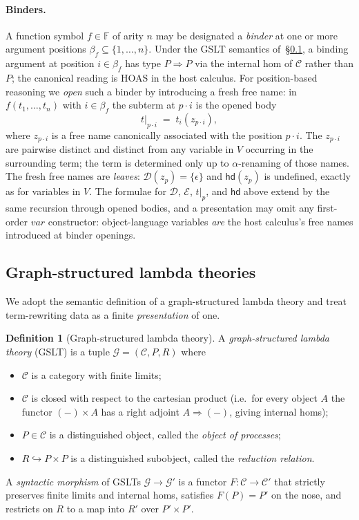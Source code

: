 \documentclass[11pt]{article}
\theoremstyle{plain}
\theoremstyle{definition}
\newtheorem{definition}[theorem]{Definition}
\theoremstyle{remark}
\newcommand{\hd}{\mathsf{hd}}
\newcommand{\dom}{\mathcal{D}}
\newcommand{\edges}{\mathcal{E}}
\begin{document}
\paragraph{Binders.}
A function symbol $f \in \mathbb{F}$ of arity $n$ may be designated a
\emph{binder} at one or more argument positions
$\beta_{f} \subseteq \{1, \ldots, n\}$. Under the GSLT semantics
of~\S\ref{ssec:gslt}, a binding argument at position $i \in \beta_{f}$
has type $P \Rightarrow P$ via the internal hom of $\mathcal{C}$
rather than $P$; the canonical reading is HOAS in the host calculus.
For position-based reasoning we \emph{open} such a binder by
introducing a fresh free name: in $f(t_{1}, \ldots, t_{n})$ with
$i \in \beta_{f}$ the subterm at $p \cdot i$ is the opened body
\[
  t|_{p \cdot i} \;=\; t_{i}(z_{p \cdot i}),
\]
where $z_{p \cdot i}$ is a free name canonically associated with the
position $p \cdot i$. The $z_{p \cdot i}$ are pairwise distinct and
distinct from any variable in $V$ occurring in the surrounding term;
the term is determined only up to $\alpha$-renaming of those names.
The fresh free names are \emph{leaves}: $\dom(z_{p}) = \{\epsilon\}$
and $\hd(z_{p})$ is undefined, exactly as for variables in $V$.
The formulae for $\dom$, $\edges$, $t|_{p}$, and $\hd$ above extend
by the same recursion through opened bodies, and a presentation may
omit any first-order $\mathit{var}$ constructor: object-language
variables \emph{are} the host calculus's free names introduced at
binder openings.

\subsection{Graph-structured lambda theories}\label{ssec:gslt}

We adopt the semantic definition of a graph-structured lambda theory
and treat term-rewriting data as a finite \emph{presentation} of one.

\begin{definition}[Graph-structured lambda theory]\label{def:gslt}
A \emph{graph-structured lambda theory} (GSLT) is a tuple
$\mathcal{G} = (\mathcal{C}, P, R)$ where
\begin{itemize}[leftmargin=*]
  \item $\mathcal{C}$ is a category with finite limits;
  \item $\mathcal{C}$ is closed with respect to the cartesian product
        (i.e.\ for every object $A$ the functor $({-}) \times A$ has
        a right adjoint $A \Rightarrow ({-})$, giving internal homs);
  \item $P \in \mathcal{C}$ is a distinguished object, called the
        \emph{object of processes};
  \item $R \hookrightarrow P \times P$ is a distinguished subobject,
        called the \emph{reduction relation}.
\end{itemize}
A \emph{syntactic morphism} of GSLTs $\mathcal{G} \to \mathcal{G}'$
is a functor $F : \mathcal{C} \to \mathcal{C}'$ that strictly preserves
finite limits and internal homs, satisfies $F(P) = P'$ on the nose,
and restricts on $R$ to a map into $R'$ over $P' \times P'$.
\end{definition}
\end{document}
